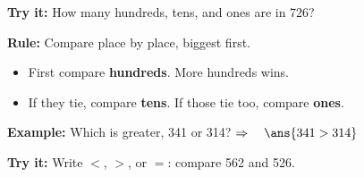 \documentclass[12pt]{article}
\begin{document}
\begin{tryitbox}
\textbf{Try it:} \quad How many hundreds, tens, and ones are in 726?\\[2pt]
\end{tryitbox}


\begin{formulabox}
\textbf{Rule:} Compare place by place, biggest first.
\begin{itemize}[leftmargin=1.2cm, itemsep=1pt, topsep=2pt]
  \item First compare \textbf{hundreds}. More hundreds wins.
  \item If they tie, compare \textbf{tens}. If those tie too, compare \textbf{ones}.
\end{itemize}
\end{formulabox}

\begin{examplebox}
\textbf{Example:} \quad Which is greater, 341 or 314?
$\Rightarrow\quad \ans{341 > 314}$
\end{examplebox}

\begin{tryitbox}
\textbf{Try it:} \quad Write $<$, $>$, or $=$: compare 562 and 526.\\[2pt]
\end{tryitbox}
\end{document}
